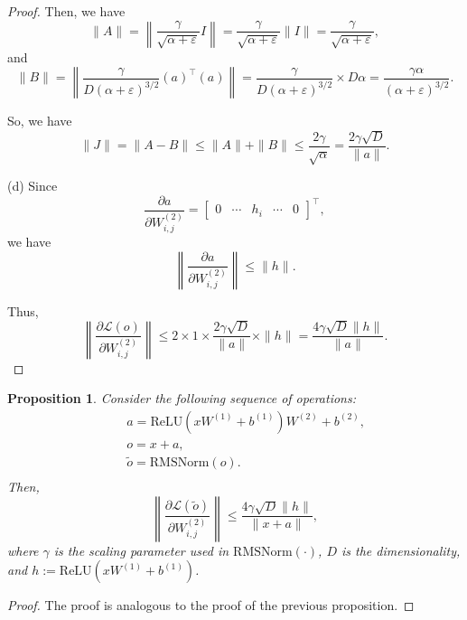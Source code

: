 \documentclass{article}
\newtheorem{proposition}{Proposition}
\begin{document}
\begin{proof}
Then, we have
\begin{equation}
    \|A\| = \left\|\frac{\gamma}{\sqrt{\alpha + \varepsilon}} I \right\| 
    = \frac{\gamma}{\sqrt{\alpha + \varepsilon}} \|I\| 
    = \frac{\gamma}{\sqrt{\alpha + \varepsilon}},
\end{equation}
and
\begin{equation}
    \|B\| = \left\|\frac{\gamma}{D(\alpha + \varepsilon)^{3/2}} \left(a\right)^\top \left(a\right)\right\| 
    = \frac{\gamma}{D(\alpha + \varepsilon)^{3/2}} \times D\alpha 
    = \frac{\gamma \alpha}{(\alpha + \varepsilon)^{3/2}}.
\end{equation}

So, we have
\begin{equation}
    \| J \| = \| A - B \| \leq \| A \| + \| B \| \leq \frac{2\gamma}{\sqrt{\alpha}} = \frac{2\gamma \sqrt{D}}{\|a\|}.
\end{equation}

(d) Since
\begin{equation}
    \frac{\partial a}{\partial W_{i,j}^{(2)}} =
    \begin{bmatrix}
    0 & \cdots & h_{i} & \cdots & 0
    \end{bmatrix}^\top,
\end{equation}
we have
\begin{equation}
    \left\| \frac{\partial a}{\partial W_{i,j}^{(2)}} \right\| \leq \| h \|.
\end{equation}

Thus,
\begin{equation}
    \left\| \frac{\partial \mathcal{L}(o)}{\partial W_{i,j}^{(2)}} \right\| \leq 2 \times 1 \times \frac{2\gamma \sqrt{D}}{\|a\|} \times \| h \| = \frac{4\gamma \sqrt{D} \| h \|}{\|a\|}.
\end{equation}

\end{proof}


\begin{proposition}
Consider the following sequence of operations:
\begin{align*}
    & \quad a = \mathrm{ReLU}(x W^{(1)} + b^{(1)})W^{(2)} + b^{(2)}, \\
    & \quad o = x + a, \\
    & \quad \tilde{o} = \mathrm{RMSNorm}(o). \\
\end{align*}
Then,
\begin{equation}
    \left\lVert \frac{\partial \mathcal{L}(\tilde{o})}{\partial W_{i,j}^{(2)}} \right\rVert 
\leq  
\frac{4\gamma \sqrt{D} \| h \|}{\|x + a\|}, 
\end{equation}
where $\gamma$ is the scaling parameter used in $\mathrm{RMSNorm}(\cdot)$, $D$ is the dimensionality, and $h := \mathrm{ReLU}\left(x W^{(1)} + b^{(1)}\right)$.
\end{proposition}

\begin{proof}
The proof is analogous to the proof of the previous proposition.
\end{proof}
\end{document}
